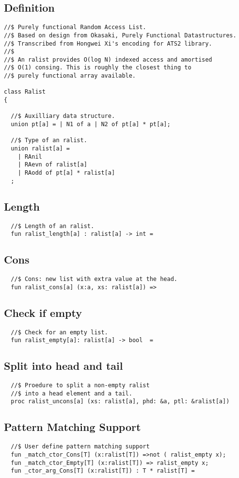 \documentclass[oneside]{book}
\begin{document}
\subsection{Definition}
\begin{verbatim}
//$ Purely functional Random Access List.
//$ Based on design from Okasaki, Purely Functional Datastructures.
//$ Transcribed from Hongwei Xi's encoding for ATS2 library.
//$
//$ An ralist provides O(log N) indexed access and amortised
//$ O(1) consing. This is roughly the closest thing to
//$ purely functional array available.

class Ralist
{

  //$ Auxilliary data structure.
  union pt[a] = | N1 of a | N2 of pt[a] * pt[a];

  //$ Type of an ralist.
  union ralist[a] = 
    | RAnil
    | RAevn of ralist[a]
    | RAodd of pt[a] * ralist[a]
  ;
\end{verbatim}
\subsection{Length}
\begin{verbatim}
  //$ Length of an ralist.
  fun ralist_length[a] : ralist[a] -> int =
\end{verbatim}
\subsection{Cons}
\begin{verbatim}
  //$ Cons: new list with extra value at the head.
  fun ralist_cons[a] (x:a, xs: ralist[a]) =>
\end{verbatim}
\subsection{Check if empty}
\begin{verbatim}
  //$ Check for an empty list.
  fun ralist_empty[a]: ralist[a] -> bool  =
\end{verbatim}
\subsection{Split into head and tail}
\begin{verbatim}
  //$ Proedure to split a non-empty ralist
  //$ into a head element and a tail.
  proc ralist_uncons[a] (xs: ralist[a], phd: &a, ptl: &ralist[a])
\end{verbatim}
\subsection{Pattern Matching Support}
\begin{verbatim}
  //$ User define pattern matching support
  fun _match_ctor_Cons[T] (x:ralist[T]) =>not ( ralist_empty x);
  fun _match_ctor_Empty[T] (x:ralist[T]) => ralist_empty x;
  fun _ctor_arg_Cons[T] (x:ralist[T]) : T * ralist[T] =
\end{verbatim}
\end{document}
